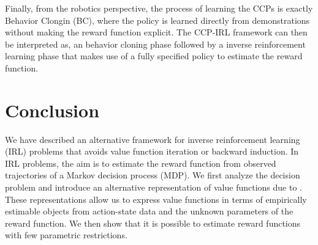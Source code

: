 \documentclass{article}
\begin{document}
Finally, from the robotics perspective, the process of learning the CCPs is exactly Behavior Clongin (BC), where the policy is learned directly from demonstrations without making the reward function explicit. The CCP-IRL framework can then be interpreted as, an behavior cloning phase followed by a inverse reinforcement learning phase that makes use of a fully specified policy to estimate the reward function.

\section{Conclusion}


We have described an alternative framework for inverse reinforcement learning (IRL) problems that avoids value function iteration or backward induction. In IRL problems, the aim is to estimate the reward function from observed trajectories of a Markov decision process (MDP). We first analyze the decision problem and introduce an alternative representation of value functions due to \cite{hotz}. These representations allow us to express value functions in terms of empirically estimable objects from action-state data and the unknown parameters of the reward function. We then show that it is possible to estimate reward functions with few parametric restrictions. 











\end{document}
